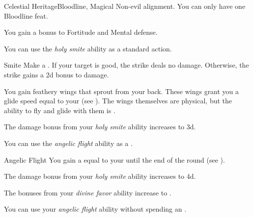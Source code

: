     \begin{feat}{Celestial Heritage}{Bloodline, Magical}
        \featpre Non-evil alignment.
         You can only have one Bloodline feat.

         You gain a  bonus to Fortitude and Mental defense.

         You can use the \textit{holy smite} ability as a standard action.
        \begin{apability}{Smite}
            Make a .
            If your target is good, the strike deals no damage.
            Otherwise, the strike gains a \plus2d bonus to damage.
        \end{apability}

         You gain feathery wings that sprout from your back.
        These wings grant you a glide speed equal to your  (see ).
        The wings themselves are physical, but the ability to fly and glide with them is .

         The damage bonus from your \textit{holy smite} ability increases to \plus3d.

         You can use the \textit{angelic flight} ability as a .
        \begin{apability}{Angelic Flight}
            You gain a  equal to your  until the end of the round (see ).
        \end{apability}

         The damage bonus from your \textit{holy smite} ability increases to \plus4d.

         The bonuses from your \textit{divine favor} ability increase to .

         You can use your \textit{angelic flight} ability without spending an .
    \end{feat}

